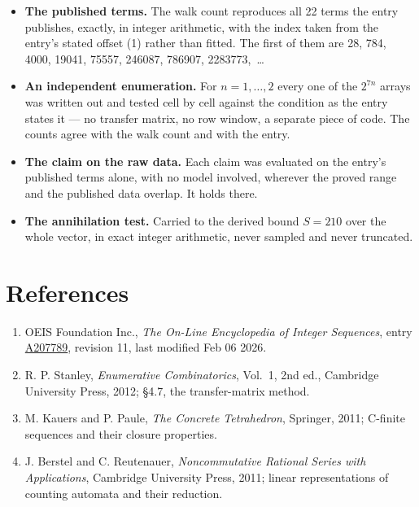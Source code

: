 \documentclass[11pt]{article}
\theoremstyle{definition}
\begin{document}
\begin{itemize}

\item {\bfseries The published terms.} The walk count reproduces all 22 terms the entry publishes, exactly, in integer arithmetic, with the index taken from the entry's stated offset (1) rather than fitted. The first of them are 28, 784, 4000, 19041, 75557, 246087, 786907, 2283773,~\dots

\item {\bfseries An independent enumeration.} For $n = 1,\dots,2$ every one of the $2^{7n}$ arrays was written out and tested cell by cell against the condition as the entry states it --- no transfer matrix, no row window, a separate piece of code. The counts agree with the walk count and with the entry.

\item {\bfseries The claim on the raw data.} Each claim was evaluated on the entry's published terms alone, with no model involved, wherever the proved range and the published data overlap. It holds there.

\item {\bfseries The annihilation test.} Carried to the derived bound $S = 210$ over the whole vector, in exact integer arithmetic, never sampled and never truncated.

\end{itemize}

\section{References}

\begin{enumerate}

\item OEIS Foundation Inc., \emph{The On-Line Encyclopedia of Integer Sequences}, entry \href{https://oeis.org/A207789}{A207789}, revision 11, last modified Feb 06 2026.

\item R. P. Stanley, \emph{Enumerative Combinatorics}, Vol.~1, 2nd ed., Cambridge University Press, 2012; \S4.7, the transfer-matrix method.

\item M. Kauers and P. Paule, \emph{The Concrete Tetrahedron}, Springer, 2011; C-finite sequences and their closure properties.

\item J. Berstel and C. Reutenauer, \emph{Noncommutative Rational Series with Applications}, Cambridge University Press, 2011; linear representations of counting automata and their reduction.

\end{enumerate}
\end{document}
